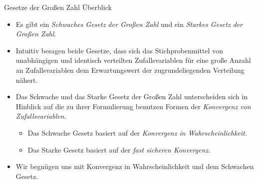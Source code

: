 \documentclass[
  8pt,
  ignorenonframetext,
]{beamer}
\begin{document}
\begin{frame}{Gesetze der Großen Zahl}
\protect\hypertarget{gesetze-der-grouxdfen-zahl}{}
Überblick \vspace{2mm} \small

\begin{itemize}
\itemsep3mm
\justifying
\item Es gibt ein \textit{Schwaches Gesetz der Großen Zahl} und ein \textit{Starkes Gesetz der Großen Zahl}.
\item Intuitiv besagen beide Gesetze, dass sich das Stichprobenmittel von unabhängigen und identisch verteilten Zufallsvariablen für eine große Anzahl an Zufallsvariablen dem Erwartungswert  der zugrundeliegenden Verteilung nähert.
\item Das Schwache und das Starke Gesetz der Großen Zahl unterscheiden sich in Hinblick auf die zu ihrer Formulierung benutzen Formen der \textit{Konvergenz von Zufallsvariablen}.
\begin{itemize}
\small
\item Das Schwache Gesetz basiert auf der \textit{Konvergenz in Wahrscheinlichkeit}.
\item Das Starke Gesetz basiert auf der \textit{fast sicheren Konvergenz}.
\end{itemize}
\item Wir begnügen uns mit Konvergenz in Wahrscheinlichkeit und dem Schwachen Gesetz.
\end{itemize}
\end{frame}
\end{document}
